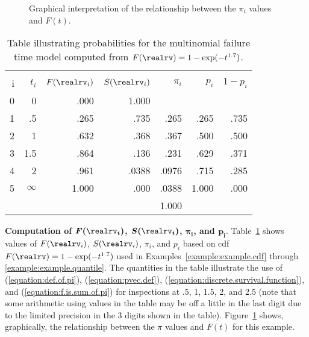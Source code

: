 \begin{figure}
\caption{Graphical interpretation of the relationship between the
 $\pi_{i}$ values and $F(t)$. }
\label{figure:start.pi.deffig.ps}
\end{figure}
\begin{table}
\caption{Table illustrating probabilities for the
multinomial failure time model computed
from $F(\realrv)=1-\exp(-t^{1.7})$.}
\centering\small
\begin{tabular} {rrrrrrr}
\\[-.5ex]
\hline
\\[-1.5ex]
   i  & $t_{i}$ & $F(\realrv_{i})$ & $S(\realrv_{i})$ & $\pi_{i}$ &
$p_{i}$&  $1- p_{i}$ \\ \hline
 0 & 0 & .000 & 1.000 &  &  &  \\
 1 & .5 & .265 & .735 & .265 & .265 & .735 \\
 2 & 1 & .632 & .368 & .367 & .500 & .500 \\
 3 & 1.5 & .864 & .136 & .231 & .629 & .371 \\
 4 & 2 & .961 & .0388 & .0976 & .715 & .285 \\
 5 &  $\infty$ & 1.000 & .000 & .0388 & 1.000 & .000 \\ \hline
 &&&& 1.000
\end{tabular}  
\label{table:multi.examp}
\end{table}
\begin{example}
{\bf Computation of $\boldsymbol{F(\realrv_{i})}$,
$\boldsymbol{S(\realrv_{i})}$, $\boldsymbol{\pi_{i}}$, and
$\boldsymbol{p_{i}}$}.
\label{example:comp.of.ffsh} 
Table~\ref{table:multi.examp} shows values of
$F(\realrv_{i})$, $S(\realrv_{i})$, $\pi_{i}$, and $p_{i}$ based on
cdf $F(\realrv)=1-\exp(-t^{1.7})$ used in
Examples~\ref{example:example.cdf} through
\ref{example:example.quantile}. The quantities
in the table illustrate the use of (\ref{equation:def.of.pi}),
(\ref{equation:pvec.def}),
(\ref{equation:discrete.survival.function}), and
(\ref{equation:f.is.sum.of.pi}) for inspections at .5, 1, 1.5, 2, and
2.5 (note that some arithmetic using values in the table may be off a
little in the last digit due to the limited precision in the 3 digits
shown in the table).  Figure~\ref{figure:start.pi.deffig.ps} shows,
graphically, the relationship between the $\pi$ values and $F(t)$ for
this example.
\end{example}


